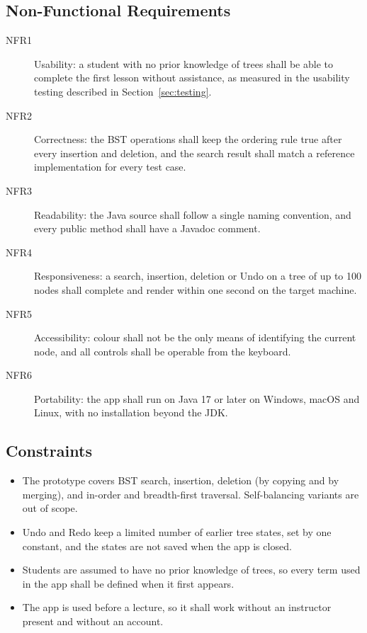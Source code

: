 \subsection{Non-Functional Requirements}
\begin{description}
    \item[NFR1] Usability: a student with no prior knowledge of trees shall be able to complete the first lesson without assistance, as measured in the usability testing described in Section~\ref{sec:testing}.
    \item[NFR2] Correctness: the BST operations shall keep the ordering rule true after every insertion and deletion, and the search result shall match a reference implementation for every test case.
    \item[NFR3] Readability: the Java source shall follow a single naming convention, and every public method shall have a Javadoc comment.
    \item[NFR4] Responsiveness: a search, insertion, deletion or Undo on a tree of up to 100 nodes shall complete and render within one second on the target machine.
    \item[NFR5] Accessibility: colour shall not be the only means of identifying the current node, and all controls shall be operable from the keyboard.
    \item[NFR6] Portability: the app shall run on Java 17 or later on Windows, macOS and Linux, with no installation beyond the JDK.
\end{description}

\subsection{Constraints}
\begin{itemize}
    \item The prototype covers BST search, insertion, deletion (by copying and by merging), and in-order and breadth-first traversal. Self-balancing variants are out of scope.
    \item Undo and Redo keep a limited number of earlier tree states, set by one constant, and the states are not saved when the app is closed.
    \item Students are assumed to have no prior knowledge of trees, so every term used in the app shall be defined when it first appears.
    \item The app is used before a lecture, so it shall work without an instructor present and without an account.
\end{itemize}